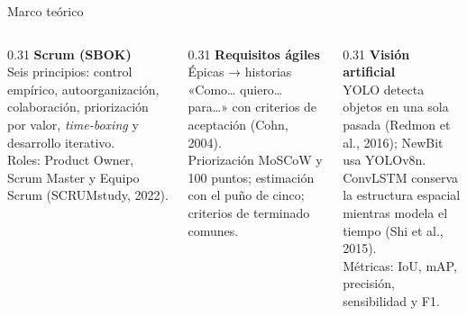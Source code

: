 \documentclass[aspectratio=169,11pt]{beamer}
\begin{document}
\begin{frame}{Marco teórico}
\begin{columns}[T]
\begin{column}{0.31\textwidth}
\textbf{\color{acento}Scrum (SBOK)}\\[4pt]\small
Seis principios: control empírico, autoorganización, colaboración, priorización por valor, \textit{time-boxing} y desarrollo iterativo.\\[4pt]
Roles: Product Owner, Scrum Master y Equipo Scrum (SCRUMstudy, 2022).
\end{column}
\begin{column}{0.31\textwidth}
\textbf{\color{acento}Requisitos ágiles}\\[4pt]\small
Épicas → historias «Como… quiero… para…» con criterios de aceptación (Cohn, 2004).\\[4pt]
Priorización MoSCoW y 100 puntos; estimación con el puño de cinco; criterios de terminado comunes.
\end{column}
\begin{column}{0.31\textwidth}
\textbf{\color{acento}Visión artificial}\\[4pt]\small
YOLO detecta objetos en una sola pasada (Redmon et al., 2016); NewBit usa YOLOv8n.\\[4pt]
ConvLSTM conserva la estructura espacial mientras modela el tiempo (Shi et al., 2015).\\[4pt]
Métricas: IoU, mAP, precisión, sensibilidad y F1.
\end{column}
\end{columns}
\end{frame}
\end{document}
